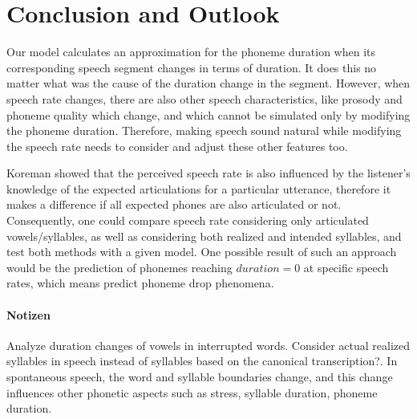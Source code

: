 \documentclass[a4paper]{scrreprt}
\begin{document}
\chapter{Conclusion and Outlook}
Our model calculates an approximation for the phoneme duration when its corresponding speech segment changes in terms of duration. It does this no matter what was the cause of the duration change in the segment. However, when speech rate changes, there are also other speech characteristics, like prosody and phoneme quality which change, and which cannot be simulated only by modifying the phoneme duration. Therefore, making speech sound natural while modifying the speech rate needs to consider and adjust these other features too.

Koreman showed \cite{Koreman_2006} that the perceived speech rate is also influenced by the listener's knowledge of the expected articulations for a particular utterance, therefore it makes a difference if all expected phones are also articulated or not. Consequently, one could compare speech rate considering only articulated vowels/syllables, as well as considering both realized and intended syllables, and test both methods with a given model. One possible result of such an approach would be the prediction of phonemes reaching $duration = 0$ at specific speech rates, which means predict phoneme drop phenomena.

\subsubsection*{Notizen}
Analyze duration changes of vowels in interrupted words.
Consider actual realized syllables in speech instead of syllables based on the canonical transcription?. In spontaneous speech, the word and syllable boundaries change, and this change influences other phonetic aspects such as stress, syllable duration, phoneme duration.

\printbibliography
\end{document}
